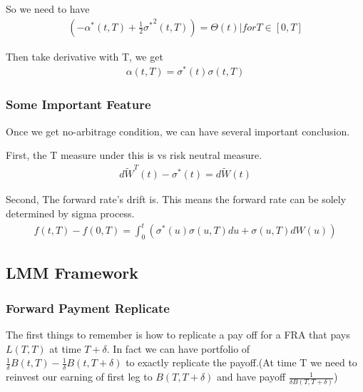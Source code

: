 So we need to have
\begin{equation}
\begin{aligned}
 (-\alpha^\ast(t, T) + \frac{1}{2} {\sigma^\ast}^2(t, T)) = \Theta(t) | for T \in [0, T]
\end{aligned}
\end{equation}

Then take derivative with T, we get
\begin{equation}
\begin{aligned}
 \alpha(t, T) = \sigma^\ast(t) \sigma(t, T)
\end{aligned}
\end{equation}

\subsubsection{Some Important Feature}
Once we get no-arbitrage condition, we can have several important conclusion.

First, the T measure under this is vs risk neutral measure.
\begin{equation}
\begin{aligned}
 d\widetilde{W}^T(t) - \sigma^\ast(t) =   d\widetilde{W}(t)
\end{aligned}
\end{equation}

Second, The forward rate's drift is. {\color{red}This means the forward rate can be solely determined by sigma process.}
\begin{equation}
\begin{aligned}
f(t, T) - f(0, T) =  \int_0^t (\sigma^\ast(u) \sigma(u, T)du + \sigma(u, T) dW(u))
\end{aligned}
\end{equation}

\subsection{LMM Framework}
\subsubsection{Forward Payment Replicate}
The first things to remember is how to replicate a pay off for a FRA that pays $L(T, T)$ at time $T + \delta$.
In fact we can {\color{red}have portfolio of $\frac{1}{\delta}B(t, T) - \frac{1}{\delta}B(t, T+\delta)$ to exactly replicate the payoff}.(At time T we need to reinvest our earning of first leg to  $B(T, T+\delta)$ and have payoff  $\frac{1}{\delta B(T, T+\delta)}$)


